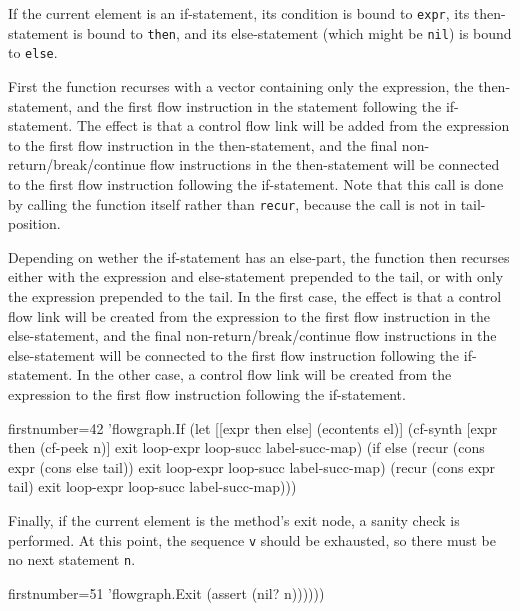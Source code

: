 \documentclass[11pt]{article}
\begin{document}
If the current element is an if-statement, its condition is bound to
\verb|expr|, its then-statement is bound to \verb|then|, and its else-statement
(which might be \verb|nil|) is bound to \verb|else|.

First the function recurses with a vector containing only the expression, the
then-statement, and the first flow instruction in the statement following the
if-statement.  The effect is that a control flow link will be added from the
expression to the first flow instruction in the then-statement, and the final
non-return/break/continue flow instructions in the then-statement will be
connected to the first flow instruction following the if-statement.  Note that
this call is done by calling the function itself rather than \verb|recur|,
because the call is not in tail-position.

\begin{sloppypar}
  Depending on wether the if-statement has an else-part, the function then
  recurses either with the expression and else-statement prepended to the tail,
  or with only the expression prepended to the tail.  In the first case, the
  effect is that a control flow link will be created from the expression to the
  first flow instruction in the else-statement, and the final
  non-return/break/continue flow instructions in the else-statement will be
  connected to the first flow instruction following the if-statement.  In the
  other case, a control flow link will be created from the expression to the
  first flow instruction following the if-statement.
\end{sloppypar}

\begin{clojurecode*}{firstnumber=42}
        'flowgraph.If
                   (let [[expr then else] (econtents el)]
                     (cf-synth [expr then (cf-peek n)]
                               exit loop-expr loop-succ label-succ-map)
                     (if else
                       (recur (cons expr (cons else tail))
                              exit loop-expr loop-succ label-succ-map)
                       (recur (cons expr tail)
                              exit loop-expr loop-succ label-succ-map)))
\end{clojurecode*}

Finally, if the current element is the method's exit node, a sanity check is
performed.  At this point, the sequence \verb|v| should be exhausted, so there
must be no next statement \verb|n|.

\begin{clojurecode*}{firstnumber=51}
        'flowgraph.Exit (assert (nil? n))))))
\end{clojurecode*}
\end{document}
